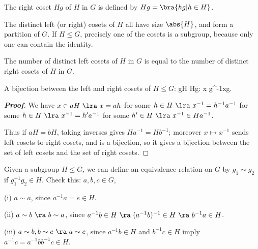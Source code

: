 \begin{definition}
The right coset $Hg$ of $H$ in $G$ is defined by $Hg = \bra{hg|h\in H}$.
\end{definition}

\begin{remark}
The distinct left (or right) cosets of $H$ all have size $\abs{H}$, and form a partition of $G$. If $H\leq G$, precisely one of the cosets is a subgroup, because only one can contain the identity.
\end{remark}

\begin{corollary}
The number of distinct left cosets of $H$ in $G$ is equal to the number of distinct right cosets of $H$ in $G$.
\end{corollary}



\begin{remark}
A bijection between the left and right cosets of $H\leq G$:
\be
gH \to Hg: x \mapsto g^{-1}xg.
\ee
\end{remark}


\begin{proof}[\bf Proof]
We have $x\in aH \ \lra \ x = ah$ for some $h\in H \ \lra\ x^{-1} = h^{-1}a^{-1}$ for some $h\in H\ \lra \ x^{-1} = h' a^{-1}$ for some $h'\in H \ \lra \ x^{-1} \in Ha^{-1}$.

Thus if $aH = bH$, taking inverses gives $Ha^{-1} = Hb^{-1}$; moreover $x\mapsto x^{-1}$ sends left cosets to right cosets, and is a bijection, so it gives a bijection between the set of left cosets and the set of right cosets.
\end{proof}




\begin{definition}
Given a subgroup $H \leq G$, we can define an equivalence relation on $G$ by $g_1 \sim g_2$ if $g^{-1}_1 g_2 \in H$. Check this: $a,b,c \in G$,
\ben
\item [(i)] $a\sim a$, since $a^{-1}a = e\in H$.
\item [(ii)] $a\sim b \ \ra\ b\sim a$, since $a^{-1}b\in H \ \ra \ (a^{-1}b)^{-1}\in H\ \ra\ b^{-1}a\in H$.
\item [(iii)] $a\sim b, b\sim c \ \ra\ a\sim c$, since $a^{-1}b\in H$ and $b^{-1}c \in H$ imply $a^{-1}c = a^{-1}bb^{-1}c \in H$.%
\een
\end{definition}

